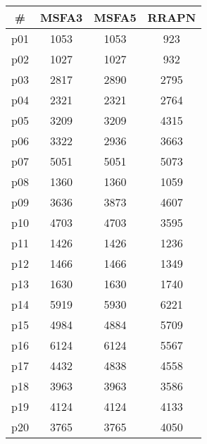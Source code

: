 \begin{tabular}{cccc}
\toprule
\textbf{\#} & \textbf{MSFA3} & \textbf{MSFA5} & \textbf{RRAPN}\\
\midrule
p01 & 1053 & 1053 & 923\\
p02 & 1027 & 1027 & 932\\
p03 & 2817 & 2890 & 2795\\
p04 & 2321 & 2321 & 2764\\
p05 & 3209 & 3209 & 4315\\
p06 & 3322 & 2936 & 3663\\
p07 & 5051 & 5051 & 5073\\
p08 & 1360 & 1360 & 1059\\
p09 & 3636 & 3873 & 4607\\
p10 & 4703 & 4703 & 3595\\
p11 & 1426 & 1426 & 1236\\
p12 & 1466 & 1466 & 1349\\
p13 & 1630 & 1630 & 1740\\
p14 & 5919 & 5930 & 6221\\
p15 & 4984 & 4884 & 5709\\
p16 & 6124 & 6124 & 5567\\
p17 & 4432 & 4838 & 4558\\
p18 & 3963 & 3963 & 3586\\
p19 & 4124 & 4124 & 4133\\
p20 & 3765 & 3765 & 4050\\
\bottomrule
\end{tabular}

